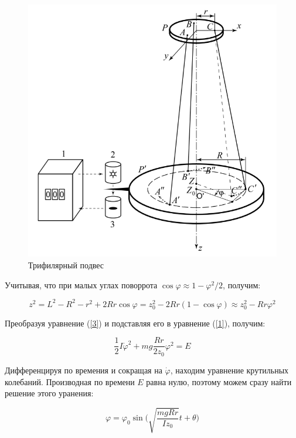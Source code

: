 \documentclass[12pt,a4paper]{article}
\begin{document}
\begin{figure}[h!]
\centering
\includegraphics[scale=0.7]{Trifilar suspension.png}
\caption{Трифилярный подвес}
\label{fig:Trifilar suspension}
\end{figure}

\vspace{0.5cm}

Учитывая, что при малых углах поворрота $\cos\varphi \approx 1-\varphi^2 /2$, получим:

\begin{equation}\label{3}
z^2 = L^2-R^2-r^2+2Rr\cos\varphi = z_0^2 - 2Rr(1-\cos\varphi) \approx z_0^2 -Rr\varphi^2
\end{equation}

Преобразуя уравнение (\ref{3}) и подставляя его в уравнение (\ref{1}), получим:

\begin{equation}\label{4}
\frac{1}{2}I\dot{\varphi}^2 + mg\frac{Rr}{2z_0}\varphi^2 = E
\end{equation}

Дифференцируя по времения и сокращая на $\dot{\varphi}$, находим уравнение крутильных колебаний. Производная по времени $E$ равна нулю, поэтому можем сразу найти решение этого уранения:

\begin{equation}\label{5}
\varphi=\varphi_0\sin \Big(\sqrt{\frac{mgRr}{Iz_0}}t + \theta\Big)
\end{equation}
\end{document}

